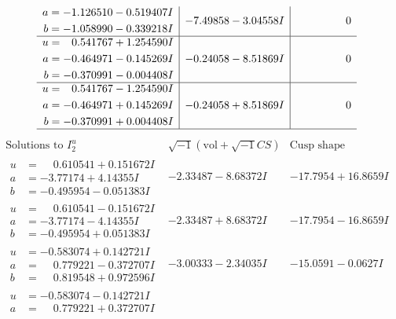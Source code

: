 \documentclass[1p]{elsarticle_modified}
\theoremstyle{definition}
\newcommand{\I}{\sqrt{-1}}
\begin{document}
$$\begin{array}{c|c|c}
\begin{aligned}
a &= -1.126510 - 0.519407 I \\
b &= -1.058990 - 0.339218 I\end{aligned}
 & -7.49858 - 3.04558 I & \phantom{-0.000000 } 0 \\ \hline\begin{aligned}
u &= \phantom{-}0.541767 + 1.254590 I \\
a &= -0.464971 - 0.145269 I \\
b &= -0.370991 - 0.004408 I\end{aligned}
 & -0.24058 - 8.51869 I & \phantom{-0.000000 } 0 \\ \hline\begin{aligned}
u &= \phantom{-}0.541767 - 1.254590 I \\
a &= -0.464971 + 0.145269 I \\
b &= -0.370991 + 0.004408 I\end{aligned}
 & -0.24058 + 8.51869 I & \phantom{-0.000000 } 0\\
 \hline 
 \end{array}$$\newpage$$\begin{array}{c|c|c}  
\text{Solutions to }I^u_{2}& \I (\text{vol} + \sqrt{-1}CS) & \text{Cusp shape}\\
 \hline 
\begin{aligned}
u &= \phantom{-}0.610541 + 0.151672 I \\
a &= -3.77174 + 4.14355 I \\
b &= -0.495954 - 0.051383 I\end{aligned}
 & -2.33487 - 8.68372 I & -17.7954 + 16.8659 I \\ \hline\begin{aligned}
u &= \phantom{-}0.610541 - 0.151672 I \\
a &= -3.77174 - 4.14355 I \\
b &= -0.495954 + 0.051383 I\end{aligned}
 & -2.33487 + 8.68372 I & -17.7954 - 16.8659 I \\ \hline\begin{aligned}
u &= -0.583074 + 0.142721 I \\
a &= \phantom{-}0.779221 - 0.372707 I \\
b &= \phantom{-}0.819548 + 0.972596 I\end{aligned}
 & -3.00333 - 2.34035 I & -15.0591 - 0.0627 I \\ \hline\begin{aligned}
u &= -0.583074 - 0.142721 I \\
a &= \phantom{-}0.779221 + 0.372707 I \\

\end{aligned}
\end{array}$$
\end{document}
